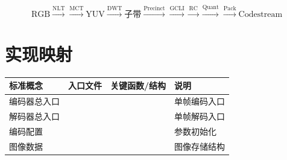 \begin{equation}
\text{RGB} \xrightarrow{\text{NLT}} \xrightarrow{\text{MCT}} \text{YUV} \xrightarrow{\text{DWT}} \text{子带} \xrightarrow{\text{Precinct}} \xrightarrow{\text{GCLI}} \xrightarrow{\text{RC}} \xrightarrow{\text{Quant}} \xrightarrow{\text{Pack}} \text{Codestream}
\end{equation}

\section{实现映射}

\begin{implmap}
\begin{tabular}{@{}L{2.0cm}L{2.0cm}L{3.0cm}L{4.5cm}@{}}
\toprule
标准概念 & 入口文件 & 关键函数/结构 & 说明 \\
\midrule
编码器总入口 &  &  & 单帧编码入口 \\
解码器总入口 &  &  & 单帧解码入口 \\
编码配置 &  &  & 参数初始化 \\
图像数据 &  &  & 图像存储结构 \\
\bottomrule
\end{tabular}
\end{implmap}
